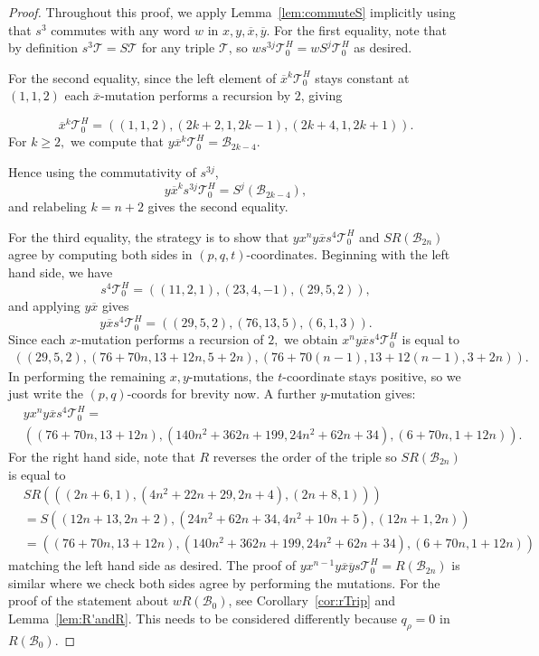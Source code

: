 \documentclass[11pt, reqno]{amsart}
\theoremstyle{remark}
\numberwithin{equation}{subsection}
\numberwithin{figure}{section}
\theoremstyle{customremark}
\newcommand{\Tt}{\mathcal{T}}
\newcommand{\ov}{\overline}
\newcommand{\T}{\mathcal{T}}
\begin{document}
\begin{proof}
    Throughout this proof, we apply Lemma~\ref{lem:commuteS} implicitly using that $s^3$ commutes with any word $w$ in $x,y,\ov{x},\ov{y}$. For the first equality, note that by definition $s^3\Tt=S\Tt$ for any triple $\Tt$, so $ws^{3j}\Tt_0^H=wS^j\Tt_0^H$ as desired. 



For the second equality, since the left element of $\ov{x}^k\Tt_0^H$ stays constant at $(1,1,2)$ each $\ov{x}$-mutation performs a recursion by $2$, giving 

 \[\ov{x}^{k}\T_0^H=\left((1,1,2),(2k+2,1,2k-1),(2k+4,1,2k+1)\right).\] 
 For $k \geq 2,$ we compute that $y\ov{x}^k\Tt_0^H=\mathcal{B}_{2k-4}.$

Hence using the commutativity of $s^{3j}$, \[y\ov{x}^k s^{3j} \Tt_0^H = S^j(\mathcal{B}_{2k-4}),\] and relabeling $k = n+2$ gives the second equality.
 

For the third equality, the strategy is to show that $yx^ny\ov{x}s^4\Tt_0^H$ and $SR(\mathcal{B}_{2n})$ agree by computing both sides in $(p,q,t)$-coordinates. Beginning with the left hand side,  we have 
\[ s^4\Tt_{0}^H=((11,2,1),(23,4,-1),(29,5,2)),\]
and applying $y\ov{x}$ gives
\[ y\ov{x}s^{4}\Tt_{0}^H=((29,5,2),(76,13,5),(6,1,3)). 
\]
Since each $x$-mutation performs a recursion of $2,$ we obtain $x^ny\ov{x}s^{4}\Tt_{0}^H$ is equal to
\begin{align*} \left((29,5,2),(76+70n,
13+12n,5+2n),(76+70(n-1),13+12(n-1),3+2n)\right).
\end{align*}
In performing the remaining $x,y$-mutations, the $t$-coordinate stays positive, so we just write the $(p,q)$-coords for brevity now. 
A further $y$-mutation gives:
\begin{align*} &yx^ny\ov{x}s^{4}\Tt_{0}^H= \\ &\left( (76+70n,13+12n),(140n^2+362n+199,24n^2+62n+34), (6+70n,1+12n)
\right).
\end{align*}
For the right hand side, note that $R$ reverses the order of the triple so $SR(\mathcal{B}_{2n})$ is equal to 
\begin{align*}
&SR\left(\left((2n+6,1),(4n^2+22n+29,2n+4),(2n+8,1)\right)\right) \\
&=S((12n+13,2n+2),(24n^2+62n+34,4n^2+10n+5),(12n+1,2n)) \\
&=
\left( (76+70n,13+12n),(140n^2+362n+199,24n^2+62n+34), (6+70n,1+12n)
\right)
\end{align*} 
matching the left hand side as desired. 
The proof of $yx^{n-1}y\ov{x}\ov{y}s\Tt_0^H=R(\mathcal{B}_{2n})$ is similar where we check both sides agree by performing the mutations. For the proof of the statement about $wR(\mathcal{B}_0)$, see Corollary~\ref{cor:rTrip} and Lemma~\ref{lem:R'andR}. This needs to be considered differently because $q_\rho=0$ in $R(\mathcal{B}_0).$

\end{proof}
\end{document}
